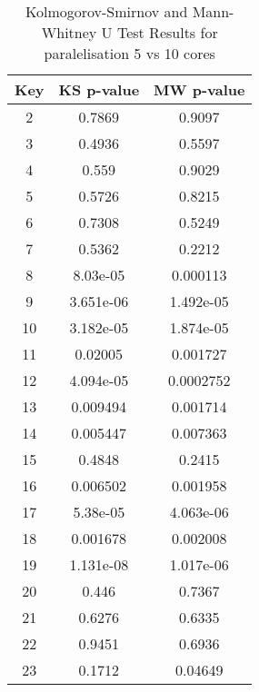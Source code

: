 \begin{table}[h!]
  \centering
  \caption{Kolmogorov-Smirnov and Mann-Whitney U Test Results for paralelisation 5 vs 10 cores}
  \begin{tabular}{||c|c|c||}
    \toprule
    \textbf{Key} & \textbf{KS p-value} & \textbf{MW p-value} \\
    \midrule
    2            & 0.7869              & 0.9097              \\
    3            & 0.4936              & 0.5597              \\
    4            & 0.559               & 0.9029              \\
    5            & 0.5726              & 0.8215              \\
    6            & 0.7308              & 0.5249              \\
    7            & 0.5362              & 0.2212              \\
    8            & 8.03e-05            & 0.000113            \\
    9            & 3.651e-06           & 1.492e-05           \\
    10           & 3.182e-05           & 1.874e-05           \\
    11           & 0.02005             & 0.001727            \\
    12           & 4.094e-05           & 0.0002752           \\
    13           & 0.009494            & 0.001714            \\
    14           & 0.005447            & 0.007363            \\
    15           & 0.4848              & 0.2415              \\
    16           & 0.006502            & 0.001958            \\
    17           & 5.38e-05            & 4.063e-06           \\
    18           & 0.001678            & 0.002008            \\
    19           & 1.131e-08           & 1.017e-06           \\
    20           & 0.446               & 0.7367              \\
    21           & 0.6276              & 0.6335              \\
    22           & 0.9451              & 0.6936              \\
    23           & 0.1712              & 0.04649             \\

\end{tabular}
\end{table}
